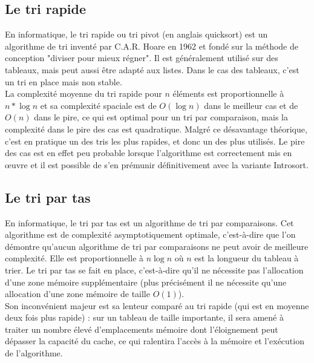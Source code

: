 \documentclass[11pt,a4paper]{article}
\begin{document}
\subsection{Le tri rapide}
En informatique, le tri rapide ou tri pivot (en anglais quicksort) est un algorithme de tri inventé par C.A.R. Hoare en 1962 et fondé sur la méthode de conception
"diviser pour mieux régner". Il est généralement utilisé sur des tableaux, mais peut aussi être adapté aux listes. Dans le cas des tableaux, c'est un tri en place
mais non stable.\\
La complexité moyenne du tri rapide pour $\displaystyle{n}$ éléments est proportionnelle à $\displaystyle{n * \log n}$ et sa complexité spaciale est de $\displaystyle{O(\log n)}$ dans le
meilleur cas et de $\displaystyle{O(n)}$ dans le pire, ce qui est optimal pour un tri par comparaison,
mais la complexité dans le pire des cas est quadratique. Malgré ce désavantage théorique, c'est en pratique un des tris les plus rapides, et donc un des plus utilisés.
Le pire des cas est en effet peu probable lorsque l'algorithme est correctement mis en œuvre et il est possible de s'en prémunir définitivement avec la variante Introsort.

\subsection{Le tri par tas}
En informatique, le tri par tas est un algorithme de tri par comparaisons. Cet algorithme est de complexité asymptotiquement optimale, c'est-à-dire que l'on démontre
qu'aucun algorithme de tri par comparaisons ne peut avoir de meilleure complexité. Elle est proportionnelle à $\displaystyle {n\log n}$
où $\displaystyle{n}$ est la longueur du tableau à trier. Le tri par tas se fait en place, c’est-à-dire qu’il ne nécessite pas l'allocation d'une zone mémoire supplémentaire
(plus précisément il ne nécessite qu'une allocation d'une zone mémoire de taille $\displaystyle {O(1)}$).\\
Son inconvénient majeur est sa lenteur comparé au tri rapide (qui est en moyenne deux fois plus rapide) : sur un tableau de taille importante, il sera
amené à traiter un nombre élevé d'emplacements mémoire dont l’éloignement peut dépasser la capacité du cache, ce qui ralentira l'accès à la mémoire et l’exécution de l’algorithme.

\newpage
\end{document}
